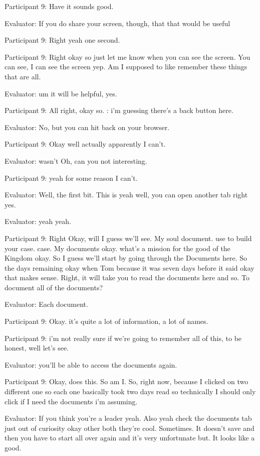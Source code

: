 \documentclass{l4proj}
\begin{document}
\begin{appendices}
Participant 9: Have it sounds good.

Evaluator: If you do share your screen, though, that that would be useful

Participant 9: Right yeah one second.

Participant 9: Right okay so just let me know when you can see the screen. You can see, I can see the screen yep. Am I supposed to like remember these things that are all.

Evaluator: um it will be helpful, yes.

Participant 9: All right, okay so. : i'm guessing there's a back button here.

Evaluator: No, but you can hit back on your browser.

Participant 9: Okay well actually apparently I can't.

Evaluator: wasn't Oh, can you not interesting.

Participant 9: yeah for some reason I can't.

Evaluator: Well, the first bit. This is yeah well, you can open another tab right yes.

Evaluator: yeah yeah.

Participant 9: Right Okay, will I guess we'll see. My soul document. use to build your case. case. My documents okay. what's a mission for the good of the Kingdom okay. So I guess we'll start by going through the Documents here. So the days remaining okay when Tom because it was seven days before it said okay that makes sense. Right, it will take you to read the documents here and so. To document all of the documents?

Evaluator: Each document.

Participant 9: Okay. it's quite a lot of information, a lot of names.

Participant 9: i'm not really sure if we're going to remember all of this, to be honest, well let's see.

Evaluator: you'll be able to access the documents again.

Participant 9: Okay, does this. So am I. So, right now, because I clicked on two different one so each one basically took two days read so technically I should only click if I need the documents i'm assuming.

Evaluator: If you think you're a leader yeah. Also yeah check the documents tab just out of curiosity okay other both they're cool. Sometimes. It doesn't save and then you have to start all over again and it's very unfortunate but. It looks like a good.


\end{appendices}
\end{document}
